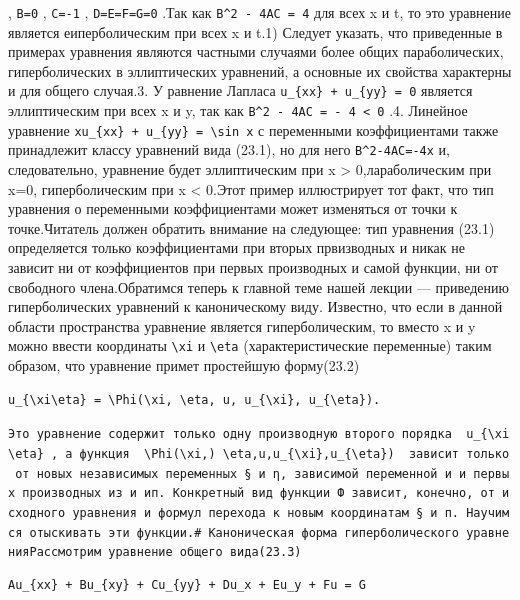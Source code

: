 \documentclass[
  ukrainian,
]{article}
\begin{document}
, \texttt{B=0} , \texttt{C=-1} , \texttt{D=E=F=G=0} .Так как
\texttt{B\^{}2\ -\ 4AC\ =\ 4} для всех x и t, то это уравнение является
еиперболическим при всех x и t.1) Следует указать, что приведенные в
примерах уравнения являются частными случаями более общих
параболических, гиперболических в эллиптических уравнений, а основные их
свойства характерны и для общего случая.3. У равнение Лапласа
\texttt{u\_\{xx\}\ +\ u\_\{yy\}\ =\ 0} является эллиптическим при всех x
и y, так как \texttt{B\^{}2\ -\ 4AC\ =\ -\ 4\ \textless{}\ 0} .4.
Линейное уравнение
\texttt{xu\_\{xx\}\ +\ u\_\{yy\}\ =\ \textbackslash{}sin\ x} с
переменными коэффициентами также принадлежит классу уравнений вида
(23.1), но для него \texttt{B\^{}2-4AC=-4x} и, следовательно, уравнение
будет эллиптическим при x \textgreater{} 0,лараболическим при x=0,
гиперболическим при x \textless{} 0.Этот пример иллюстрирует тот факт,
что тип уравнения о переменными коэффициентами может изменяться от точки
к точке.Читатель должен обратить внимание на следующее: тип уравнения
(23.1) определяется только коэффициентами при вторых првизводных и никак
не зависит ни от коэффициентов при первых производных и самой функции,
ни от свободного члена.Обратимся теперь к главной теме нашей лекции ---
приведению гиперболических уравнений к каноническому виду. Известно, что
если в данной области пространства уравнение является гиперболическим,
то вместо x и y можно ввести координаты \texttt{\textbackslash{}xi} и
\texttt{\textbackslash{}eta} (характеристические переменные) таким
образом, что уравнение примет простейшую форму(23.2)

\begin{verbatim}
u_{\xi\eta} = \Phi(\xi, \eta, u, u_{\xi}, u_{\eta}).
\end{verbatim}

\texttt{Это\ уравнение\ содержит\ только\ одну\ производную\ второго\ порядка\ \ \textquotesingle{}u\_\{\textbackslash{}xi\textbackslash{}eta\}\textquotesingle{}\ ,\ а\ функция\ \ \textquotesingle{}\textbackslash{}Phi(\textbackslash{}xi,)\ \textbackslash{}eta,u,u\_\{\textbackslash{}xi\},u\_\{\textbackslash{}eta\})\textquotesingle{}\ \ зависит\ только\ от\ новых\ независимых\ переменных\ §\ и\ η,\ зависимой\ переменной\ и\ и\ первых\ производных\ из\ и\ ип.\ Конкретный\ вид\ функции\ Ф\ зависит,\ конечно,\ от\ исходного\ уравнения\ и\ формул\ перехода\ к\ новым\ координатам\ §\ и\ п.\ Научимся\ отыскивать\ эти\ функции.\#\ Каноническая\ форма\ гиперболического\ уравненияРассмотрим\ уравнение\ общего\ вида(23.3)}

\begin{verbatim}
Au_{xx} + Bu_{xy} + Cu_{yy} + Du_x + Eu_y + Fu = G
\end{verbatim}
\end{document}
